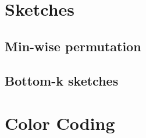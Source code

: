 \clearpage

\section{Sketches}

\clearpage

\subsection*{Min-wise permutation}

\clearpage

\subsection*{Bottom-k sketches}

\clearpage

\section{Color Coding}

\cite{Alon:1995:COL:210332.210337}

\clearpage
